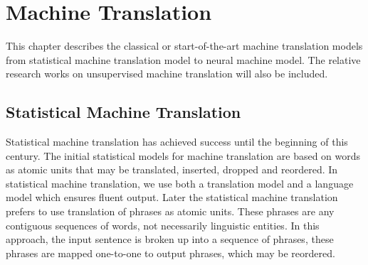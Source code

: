 \chapter{Machine Translation}
This chapter describes the classical or start-of-the-art machine translation models from statistical machine translation model to neural machine model. The relative research works on unsupervised machine translation will also be included.


\section{Statistical Machine Translation}
%
%
Statistical machine translation has achieved success until the beginning of this century. The initial statistical models for machine translation are based on words as atomic units that may be translated, inserted, dropped and reordered. In statistical machine translation, we use both a translation model and a language model which ensures fluent output. Later the statistical machine translation prefers to use translation of phrases as atomic units. These phrases are any contiguous sequences of words, not necessarily linguistic entities. In this approach, the input sentence is broken up into a sequence of phrases, these phrases are mapped one-to-one to output phrases, which may be reordered.


